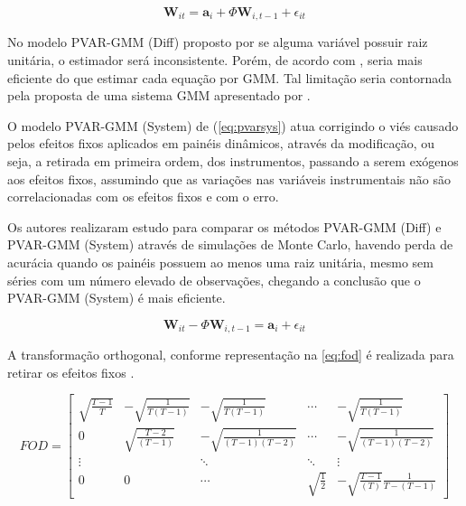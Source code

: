 \documentclass[
  12pt,
  12pt,
  openright,
  oneside,
  a4paper,
  chapter=TITLE,
  section=TITLE,
  subsection=TITLE,
  subsubsection=TITLE,
  portugues,
  sumario=tradicional]{abntex2}
\begin{document}
\begin{equation}\label{eq:pvar}
\mathbf{W}_{it} = \mathbf{a}_{i} + \Phi \mathbf{W}_{i, t-1} + \epsilon_{it}  
\end{equation}

No modelo PVAR-GMM (Diff) proposto por \textcite{arellanobond:1991} se alguma variável possuir raiz unitária, o estimador será inconsistente. Porém, de acordo com \textcite{binder:2005}, seria mais eficiente do que estimar cada equação por GMM. Tal limitação seria contornada pela proposta de uma sistema GMM apresentado por \textcite{blundelbond:1998}.

O modelo PVAR-GMM (System) de \textcite{blundelbond:1998} (\autoref{eq:pvarsys}) atua corrigindo o viés causado pelos efeitos fixos aplicados em painéis dinâmicos, através da modificação, ou seja, a retirada em primeira ordem, dos instrumentos, passando a serem exógenos aos efeitos fixos, assumindo que as variações nas variáveis instrumentais não são correlacionadas com os efeitos fixos e com o erro.

Os autores \textcite{binder:2005} realizaram estudo para comparar os métodos PVAR-GMM (Diff) e PVAR-GMM (System) através de simulações de Monte Carlo, havendo perda de acurácia quando os painéis possuem ao menos uma raiz unitária, mesmo sem séries com um número elevado de observações, chegando a conclusão que o PVAR-GMM (System) é mais eficiente.

\begin{equation}\label{eq:pvarsys}
\mathbf{W}_{it} - \Phi\mathbf{W}_{i, t-1} = \mathbf{a}_{i} + \epsilon_{it}  
\end{equation}

A transformação orthogonal, conforme representação na \autoref{eq:fod} é realizada para retirar os efeitos fixos \cite{sigmund:2008}.

\begin{equation}\label{eq:fod}
FOD = \left[ \begin{array}{ccccc}
\sqrt{\frac{T-1}{T}}  & - \sqrt{\frac{1}{T(T - 1)}} & - \sqrt{\frac{1}{T(T - 1)}} & \cdots & - \sqrt{\frac{1}{T(T - 1)}}  \\
0 & \sqrt{\frac{T - 2 }{(T - 1)}} & - \sqrt{\frac{1}{(T - 1)(T - 2 )}} & \cdots &  - \sqrt{\frac{1}{(T - 1)(T - 2 )}} \\
\vdots & & \ddots & \ddots & \vdots \\
0 & 0 & \cdots & \sqrt{\frac{1}{2}} & - \sqrt{\frac{T - 1}{(T)}}\frac{1}{T-(T-1)}
\end{array}\right]
\end{equation}
\end{document}
